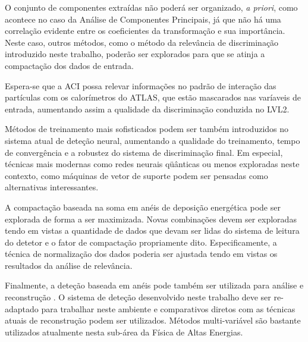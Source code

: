 O conjunto de componentes extraídas não poderá ser organizado, \textit{a
priori}, como acontece no caso da Análise de Componentes Principais, já que
não há uma correlação evidente entre os coeficientes da transformação e sua
importância. Neste caso, outros métodos, como o método da relevância de
discriminação introduzido neste trabalho, poderão ser explorados para que se
atinja a compactação dos dados de entrada.

Espera-se que a ACI possa relevar informações no padrão de interação das
partículas com os calorímetros do ATLAS, que estão mascarados nas varíaveis de
entrada, aumentando assim a qualidade da discriminação conduzida no LVL2.

Métodos de treinamento mais sofisticados podem ser também introduzidos no
sistema atual de deteção neural, aumentando a qualidade do treinamento, tempo
de convergência e a robustez do sistema de discriminação final. Em especial,
técnicas mais modernas como redes neurais qüânticas \cite{qnns} ou menos
exploradas neste contexto, como máquinas de vetor de suporte \cite{haykin}
podem ser pensadas como alternativas interessantes.

A compactação baseada na soma em anéis de deposição energética pode ser
explorada de forma a ser maximizada. Novas combinações devem ser exploradas
tendo em vistas a quantidade de dados que devam ser lidas do sistema de
leitura do detetor e o fator de compactação propriamente dito. Especificamente,
a técnica de normalização dos dados poderia ser ajustada tendo em vistas os
resultados da análise de relevância.

Finalmente, a deteção baseada em anéis pode também ser utilizada para análise
e reconstrução . O sistema de deteção desenvolvido neste trabalho
deve ser re-adaptado para trabalhar neste ambiente e comparativos diretos com
as técnicas atuais de reconstrução podem ser utilizados. Métodos
multi-variável são bastante utilizados atualmente nesta sub-área da Física de
Altas Energias.

